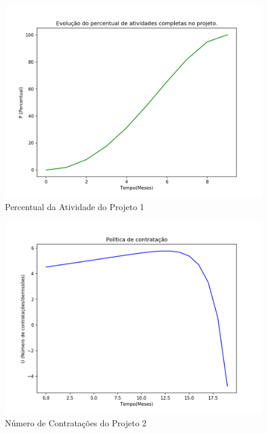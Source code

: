 \documentclass[14pt, oneside]{book}
\theoremstyle{definition}
\begin{document}
            \begin{figure}[H]
                \centering
                \includegraphics[scale=0.9]{empresa1_p.png}
                \caption{Percentual da Atividade do Projeto 1}
                \label{empresa1_p}
            \end{figure}
            
                \begin{figure}[H]
                \centering
                \includegraphics[scale=0.9]{empresa2_u.png}
                \caption{Número de Contratações do Projeto 2}
                \label{empresa2_u}
            \end{figure}
            
\end{document}
